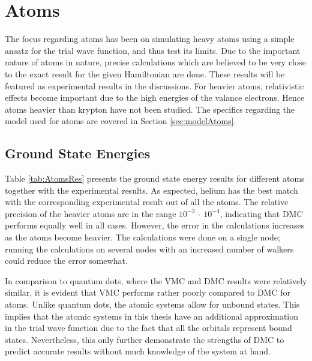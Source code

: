 \section{Atoms}
 
 The focus regarding atoms has been on simulating heavy atoms using a simple ansatz for the trial wave function, and thus test its limits. Due to the important nature of atoms in nature, precise calculations which are believed to be very close to the exact result for the given Hamiltonian are done. These results will be featured as experimental results in the discussions. For heavier atoms, relativistic effects become important due to the high energies of the valance electrons. Hence atoms heavier than krypton have not been studied. The specifics regarding the model used for atoms are covered in Section \ref{sec:modelAtoms}.
 
\subsection{Ground State Energies}
 
 Table \ref{tab:AtomsRes} presents the ground state energy results for different atoms together with the experimental results. As expected, helium has the best match with the corresponding experimental result out of all the atoms. The relative precision of the heavier atoms are in the range $10^{-3}$ - $10^{-4}$, indicating that DMC performs equally well in all cases. However, the error in the calculations increases as the atoms become heavier. The calculations were done on a single node; running the calculations on several nodes with an increased number of walkers could reduce the error somewhat. 
 
 In comparison to quantum dots, where the VMC and DMC results were relatively similar, it is evident that VMC performs rather poorly compared to DMC for atoms. Unlike quantum dots, the atomic systems allow for unbound states. This implies that the atomic systems in this thesis have an additional approximation in the trial wave function due to the fact that all the orbitals represent bound states. Nevertheless, this only further demonstrate the strengths of DMC to predict accurate results without much knowledge of the system at hand.
 
